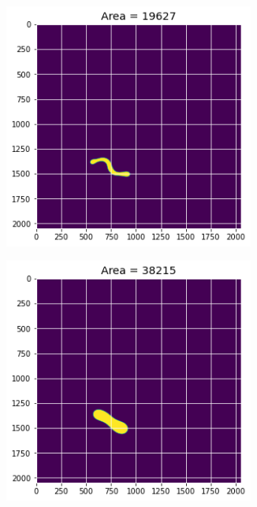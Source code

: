 \documentclass[12pt, a4paper]{report}
\begin{document}
\begin{figure}[H]
\centering
\begin{subfigure}{.24\textwidth}
  \centering
  \includegraphics[width=0.9\textwidth]{Pictures/Growth/3.1.jpeg}
  \label{img:microstrImg}
\end{subfigure}
\begin{subfigure}{.24\textwidth}
  \centering
  \includegraphics[width=0.9\textwidth]{Pictures/Growth/3.2.jpeg}

\end{subfigure}
\end{figure}
\end{document}
